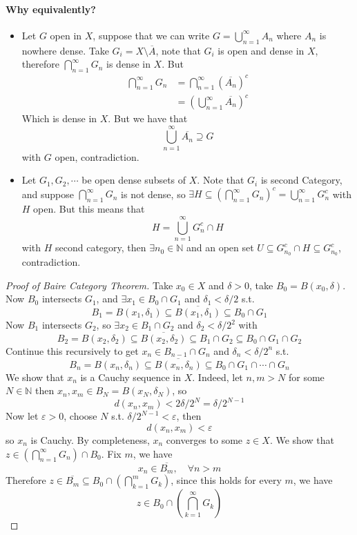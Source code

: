 \documentclass[11pt,a4paper]{article}
\theoremstyle{definition}
\theoremstyle{plain}
\theoremstyle{remark}
\newcommand{\N}{\mathbb{N}}
\newcommand{\1}{\mathbbm{1}}
\begin{document}
\paragraph{Why equivalently?} 
\begin{itemize}
    \item[$\implies$] Let $G$ open in $X$, suppose that we can write $G = \bigcup_{n=1}^\infty A_n$ where $A_n$ is nowhere dense. Take $G_i = X \setminus \overline{A}$, 
    note that $G_i$ is open and dense in $X$, therefore $\bigcap_{n=1}^\infty G_n$ is dense in $X$. But 
    \begin{align*}
        \bigcap_{n=1}^\infty G_n &= \bigcap_{n=1}^\infty (\overline{A_n})^c \\
        &= \left(\bigcup_{n=1}^\infty \overline{A_n}\right)^c 
    \end{align*}
    Which is dense in $X$. But we have that 
    $$\bigcup_{n=1}^\infty \overline{A_n} \supseteq G$$
    with $G$ open, contradiction.

    \item[$\impliedby$] Let $G_1, G_2, \cdots$ be open dense subsets of $X$. Note that $G_i$ is second Category, and suppose $\bigcap_{n=1}^\infty G_n$ is not dense, 
    so $\exists H \subseteq \left(\bigcap_{n=1}^\infty G_n\right)^c = \bigcup_{n=1}^\infty G_n^c$ with $H$ open. But this means that 
    $$H = \bigcup_{n=1}^\infty G_n^c \cap H$$
    with $H$ second category, then $\exists n_0 \in \N$ and an open set $U \subseteq G_{n_0}^c \cap H \subseteq G_{n_0}^c$, contradiction.
\end{itemize} 


\begin{proof}[Proof of Baire Category Theorem]
    Take $x_0 \in X$ and $\delta > 0$, take $B_0 = B(x_0, \delta)$. Now $B_0$ intersects $G_1$, and $\exists x_1 \in B_0 \cap G_1$ and 
    $\delta_1 < \delta/2$ s.t. 
    $$B_1 = B(x_1, \delta_1) \subseteq \overline{B(x_1, \delta_1)} \subseteq B_0 \cap G_1$$
    Now $B_1$ intersects $G_2$, so $\exists x_2 \in B_1 \cap G_2$ and $\delta_2 < \delta/2^2$ with 
    $$B_2 = B(x_2, \delta_2) \subseteq \overline{B(x_2, \delta_2)} \subseteq B_1 \cap G_2 \subseteq B_0 \cap G_1 \cap G_2$$
    Continue this recursively to get $x_n \in B_{n-1} \cap G_n$ and $\delta_n < \delta/2^n$ s.t. 
    $$B_n = B(x_n, \delta_n) \subseteq \overline{B(x_n, \delta_n)} \subseteq B_0 \cap G_1 \cap \cdots \cap G_n$$
    We show that $x_n$ is a Cauchy sequence in $X$. Indeed, let $n,m > N$ for some $N \in \N$ then $x_n, x_m \in B_N = B(x_N, \delta_N)$, so 
    $$d(x_n, x_m) < 2 \delta/2^{N} = \delta/2^{N-1}$$
    Now let $\varepsilon > 0$, choose $N$ s.t. $\delta/2^{N-1} < \varepsilon$, then 
    $$d(x_n, x_m)< \varepsilon$$
    so $x_n$ is Cauchy. By completeness, $x_n$ converges to some $z \in X$. We show that $z \in \left(\bigcap_{n=1}^\infty G_n\right) \cap B_0$. 
    Fix $m$, we have  
    $$x_n \in \overline{B_m}, \quad \forall n > m$$ 
    Therefore $z \in \overline{B_m} \subseteq B_0 \cap \left(\bigcap_{k=1}^m G_k\right)$, since this holds for every $m$, we have 
    $$z \in B_0 \cap \left(\bigcap_{k=1}^\infty G_k\right)$$
\end{proof}
\end{document}
